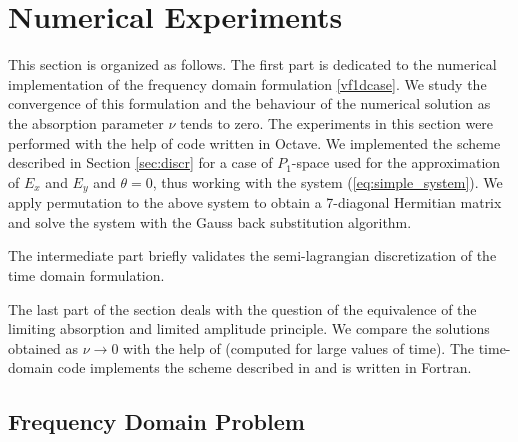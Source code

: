 
\section{Numerical Experiments}
This section is organized as follows. The first part is dedicated to the numerical implementation
of the frequency domain formulation \eqref{vf1dcase}. We study the convergence of this formulation and the behaviour 
of the numerical solution as the absorption parameter $\nu$ tends to zero. The experiments in this section were 
performed with the help of  code written in Octave.  
We implemented the scheme described in Section \ref{sec:discr} for a case of $P_{1}$-space used 
for the approximation of $E_{x}$ and $E_{y}$ and $\theta=0$, thus working with the system (\ref{eq:simple_system}). 
We apply permutation to the above system 
to obtain a 7-diagonal Hermitian matrix and solve the system with the Gauss back substitution algorithm. 

The intermediate part briefly validates the semi-lagrangian discretization of the time domain formulation.

The last part of the section deals with the question of the equivalence of the limiting absorption and limited amplitude 
principle. We compare the solutions obtained as $\nu\rightarrow 0$ with the help of (computed for large values of time). 
The time-domain code implements the scheme described in  and 
is written in Fortran.
 
\subsection{Frequency Domain Problem}
\label{sec:freq_dep}
